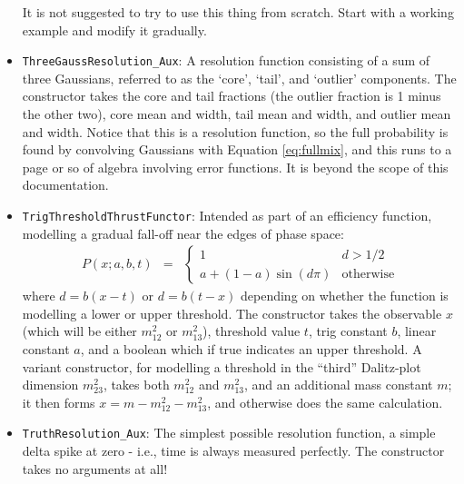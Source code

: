 \documentclass[12pt,pdflatex]{article}
\begin{document}
\begin{itemize}
It is not suggested to try to use this thing from scratch. Start with a working
example and modify it gradually. 
\item \texttt{ThreeGaussResolution\_Aux}: A resolution function
consisting of a sum of three Gaussians, referred to as the `core', 
`tail', and `outlier' components. The constructor takes the core and
tail fractions (the outlier fraction is 1 minus the other two), core
mean and width, tail mean and width, and outlier mean and width. Notice
that this is a resolution function, so the full probability is found by
convolving Gaussians with Equation \ref{eq:fullmix}, and this runs to a page
or so of algebra involving error functions. It is beyond the scope of this
documentation. 
\item \texttt{TrigThresholdThrustFunctor}: Intended as part of an efficiency
function, modelling a gradual fall-off near the edges of phase space:
\begin{eqnarray}
P(x;a,b,t) &=& \left\{\begin{matrix}
1 & d > 1/2 \\
a + (1-a) \sin(d\pi) & \mathrm{otherwise}
\end{matrix}
\right. 
\end{eqnarray}
where $d=b(x-t)$ or $d=b(t-x)$ depending on whether the function is modelling
a lower or upper threshold. The constructor takes the observable $x$ 
(which will be either $m^2_{12}$ or $m^2_{13}$), 
threshold value $t$, trig constant $b$, linear constant $a$, and a boolean
which if true indicates an upper threshold. A variant
constructor, for modelling a threshold in the ``third'' Dalitz-plot dimension
$m^2_{23}$, takes both $m^2_{12}$ and $m^2_{13}$, and an additional mass constant $m$;
it then forms $x = m - m^2_{12} - m^2_{13}$, and otherwise does the same calculation. 
\item \texttt{TruthResolution\_Aux}: The simplest possible resolution
function, a simple delta spike at zero - i.e., time is always measured
perfectly. The constructor takes no arguments at all! 
\end{itemize}
\end{document}
